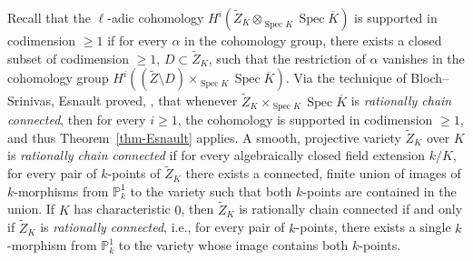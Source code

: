 \documentclass[11pt]{article}
\theoremstyle{definition}
\numberwithin{equation}{section}
\numberwithin{figure}{section}
\numberwithin{table}{section}
\newcommand{\mbb}{\mathbb}
\newcommand{\PP}{\mbb{P}}
\newcommand{\wt}{\widetilde}
\newcommand{\ol}{\overline}
\newcommand{\FR}{K}
\DeclareMathOperator{\SP}{Spec}
\begin{document}
Recall that the $\ell$-adic cohomology $H^i(\wt{Z}_\FR \otimes_{\SP \FR}
\SP \ol{\FR})$ is supported in codimension $\geq 1$ if for every $\alpha$ in the cohomology group, there exists a closed subset of codimension $\geq 1$, $D\subset \wt{Z}_\FR$, such that the restriction of $\alpha$ vanishes in the cohomology group $H^i((\wt{Z}\setminus D)\times_{\SP \FR} \SP \ol{\FR})$. Via the technique of Bloch--Srinivas, Esnault proved, \cite{Esnault}, that whenever $\wt{Z}_\FR\times_{\SP \FR} \SP \ol{\FR}$ is \emph{rationally chain connected}, then for every $i\geq 1$, the cohomology is supported in codimension $\geq 1$, and thus Theorem~\ref{thm-Esnault} applies. A smooth, projective variety $\wt{Z}_\FR$ over $\FR$ is \emph{rationally chain connected} if for every algebraically closed field extension $k/\FR$, for every pair of $k$-points of $\wt{Z}_\FR$ there exists a connected, finite union of images of $k$-morphisms from $\PP^1_k$ to the variety such that both $k$-points are contained in the union. If $\FR$ has characteristic $0$, then $\wt{Z}_\FR$ is rationally chain connected if and only if $\wt{Z}_\FR$ is \emph{rationally connected}, i.e., for every pair of $k$-points, there exists a single $k$-morphism from $\PP^1_k$ to the variety whose image contains both $k$-points.
\end{document}
